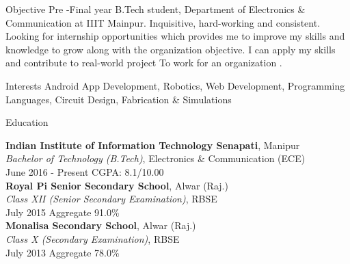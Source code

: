\documentclass{resume} %
\begin{document}

\begin{rSection}{ Objective}
Pre -Final year B.Tech student, Department of Electronics \& Communication at  IIIT Mainpur. Inquisitive, hard-working and consistent. Looking for internship opportunities which provides me to improve my skills and knowledge to grow along with the organization objective. I can apply my skills and
contribute to real-world project To work for an organization .
\end{rSection}

\begin{rSection}{ Interests}
Android App Development,  Robotics,  Web Development, Programming Languages, Circuit Design, Fabrication \& Simulations

\end{rSection}


\begin{rSection}{Education}

\textbf{Indian Institute of Information Technology Senapati}, Manipur\\
{\sl Bachelor of Technology (B.Tech)}, Electronics \& Communication (ECE)\\
June 2016 - Present
\hfill CGPA: 8.1/10.00\\

\textbf{Royal Pi Senior Secondary School}, Alwar (Raj.) \\
{\sl Class XII (Senior Secondary Examination)}, RBSE\\
July 2015
\hfill Aggregate 91.0\%
\\

\textbf{Monalisa Secondary School}, Alwar (Raj.) \\
{\sl Class X (Secondary Examination)}, RBSE\\
July 2013
\hfill Aggregate 78.0\%


\end{rSection}
\end{document}
